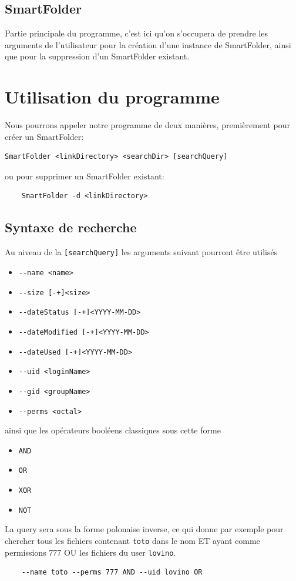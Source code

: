 \documentclass[a4paper]{article}
\begin{document}
\subsection{SmartFolder}
Partie principale du programme, c'est ici qu'on s'occupera de prendre les arguments de l'utilisateur pour la création d'une instance de SmartFolder, ainsi que pour la suppression d'un SmartFolder existant.
\section{Utilisation du programme}
Nous pourrons appeler notre programme de deux manières, premièrement pour créer un SmartFolder:
\begin{verbatim}
SmartFolder <linkDirectory> <searchDir> [searchQuery]
\end{verbatim}
ou pour supprimer un SmartFolder existant:
\begin{verbatim}
	SmartFolder -d <linkDirectory>
\end{verbatim}
\subsection{Syntaxe de recherche}
Au niveau de la \verb+[searchQuery]+ les arguments suivant pourront être utilisés
\begin{itemize}
	\item \verb/--name <name>/
	\item \verb/--size [-+]<size>/
	\item \verb/--dateStatus [-+]<YYYY-MM-DD>/
	\item \verb/--dateModified [-+]<YYYY-MM-DD>/
	\item \verb/--dateUsed [-+]<YYYY-MM-DD>/
	\item \verb/--uid <loginName>/
	\item \verb/--gid <groupName>/
	\item \verb/--perms <octal>/
\end{itemize}
ainsi que les opérateurs booléens classiques sous cette forme
\begin{itemize}
	\item \verb+AND+
	\item \verb+OR+
	\item \verb+XOR+
	\item \verb+NOT+
\end{itemize}

La query sera sous la forme polonaise inverse, ce qui donne par exemple pour chercher tous les fichiers contenant \verb+toto+ dans le nom ET ayant comme permissions 777 OU les fichiers du user \verb+lovino+.
\begin{verbatim}
	--name toto --perms 777 AND --uid lovino OR
\end{verbatim}
\end{document}
